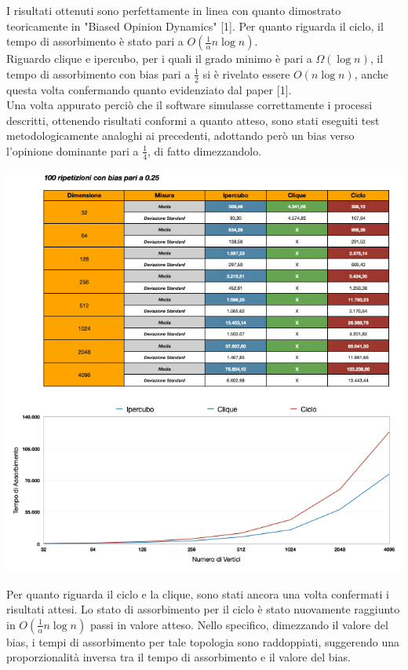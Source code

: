 \documentclass{article}
\begin{document}
I risultati ottenuti sono perfettamente in linea con quanto dimostrato teoricamente in  "Biased Opinion Dynamics" [1]. Per quanto riguarda il ciclo, il tempo di assorbimento è stato pari a $O(\frac{1}{\alpha}n\log{}n)$. \\
Riguardo clique e ipercubo, per i quali il grado minimo è pari a $\Omega(\log{}n)$, il tempo di assorbimento con bias pari a $\frac{1}{2}$ si è rivelato essere $O(n\log{}n)$, anche questa volta confermando quanto evidenziato dal paper [1].\\
Una volta appurato perciò che il software simulasse correttamente i processi descritti, ottenendo risultati conformi a quanto atteso, sono stati eseguiti test metodologicamente analoghi ai precedenti, adottando però un bias verso l'opinione dominante pari a $\frac{1}{4}$, di fatto dimezzandolo.\\
\begin{center}
\includegraphics[width=1\textwidth]{test_bias025.png}
\end{center}
Per quanto riguarda il ciclo e la clique, sono stati ancora una volta confermati i risultati attesi.
Lo stato di assorbimento per il ciclo è stato nuovamente raggiunto in $O(\frac{1}{\alpha}n\log{}n)$ passi in valore atteso. Nello specifico, dimezzando il valore del bias, i tempi di assorbimento per tale topologia sono raddoppiati, suggerendo una proporzionalità inversa tra il tempo di assorbimento e il valore del bias.\\
\end{document}
